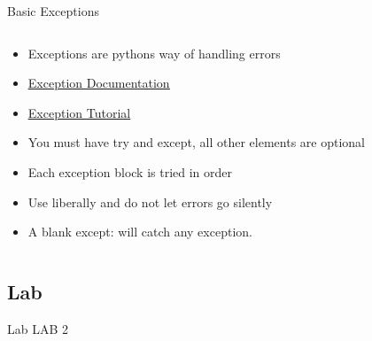 % 
% 
% 
\begin{Slide}{Basic Exceptions}
  \begin{columns}
    \begin{column}{.48\textwidth}
      
      \begin{itemize}
      \item Exceptions are pythons way of handling errors
      \item \underline{\href{https://docs.python.org/3/library/exceptions.html}{Exception Documentation}}
      \item \underline{\href{https://docs.python.org/3/tutorial/errors.html}{Exception Tutorial}}
      \item You must have try and except, all other elements are optional
      \item Each exception block is tried in order
      \item Use liberally and do not let errors go silently
      \item A blank except: will catch any exception.
      \end{itemize}
      
      
    \end{column}

    \hfill

    \begin{column}{.48\textwidth}
      \pause

      \inputminted[firstline=3,
      lastline=27,
      breaklines,
      fontsize=\tiny,
      bgcolor=Background,
      linenos]{python}{../src/exceptions.py}
            
      
    \end{column}
  \end{columns}
\end{Slide}





\subsection{Lab}
\begin{Slide}{Lab}
  LAB 2
\end{Slide}
